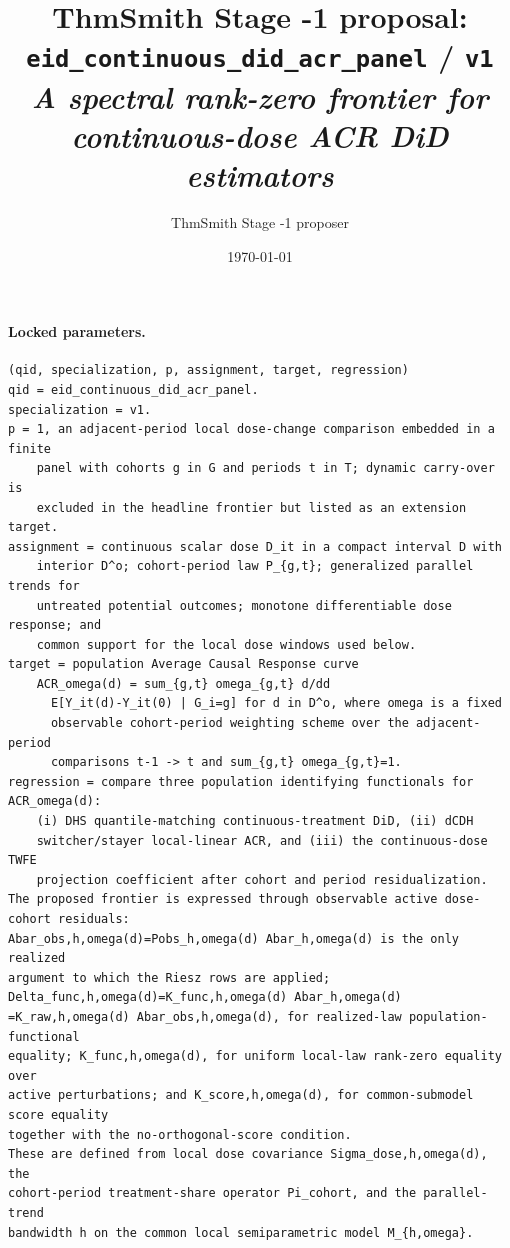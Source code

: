 \documentclass[11pt]{article}
\title{ThmSmith Stage -1 proposal: \texttt{eid\_continuous\_did\_acr\_panel} / \texttt{v1}%
  \\ \large\textit{A spectral rank-zero frontier for continuous-dose ACR DiD estimators}}
\author{ThmSmith Stage -1 proposer}
\date{\today}
\theoremstyle{definition}
\theoremstyle{plain}
\theoremstyle{remark}
\begin{document}
\maketitle


\paragraph{Locked parameters.}
\begin{verbatim}
(qid, specialization, p, assignment, target, regression)
qid = eid_continuous_did_acr_panel.
specialization = v1.
p = 1, an adjacent-period local dose-change comparison embedded in a finite
    panel with cohorts g in G and periods t in T; dynamic carry-over is
    excluded in the headline frontier but listed as an extension target.
assignment = continuous scalar dose D_it in a compact interval D with
    interior D^o; cohort-period law P_{g,t}; generalized parallel trends for
    untreated potential outcomes; monotone differentiable dose response; and
    common support for the local dose windows used below.
target = population Average Causal Response curve
    ACR_omega(d) = sum_{g,t} omega_{g,t} d/dd
      E[Y_it(d)-Y_it(0) | G_i=g] for d in D^o, where omega is a fixed
      observable cohort-period weighting scheme over the adjacent-period
      comparisons t-1 -> t and sum_{g,t} omega_{g,t}=1.
regression = compare three population identifying functionals for ACR_omega(d):
    (i) DHS quantile-matching continuous-treatment DiD, (ii) dCDH
    switcher/stayer local-linear ACR, and (iii) the continuous-dose TWFE
    projection coefficient after cohort and period residualization.
The proposed frontier is expressed through observable active dose-cohort residuals:
Abar_obs,h,omega(d)=Pobs_h,omega(d) Abar_h,omega(d) is the only realized
argument to which the Riesz rows are applied;
Delta_func,h,omega(d)=K_func,h,omega(d) Abar_h,omega(d)
=K_raw,h,omega(d) Abar_obs,h,omega(d), for realized-law population-functional
equality; K_func,h,omega(d), for uniform local-law rank-zero equality over
active perturbations; and K_score,h,omega(d), for common-submodel score equality
together with the no-orthogonal-score condition.
These are defined from local dose covariance Sigma_dose,h,omega(d), the
cohort-period treatment-share operator Pi_cohort, and the parallel-trend
bandwidth h on the common local semiparametric model M_{h,omega}.
\end{verbatim}
\end{document}
